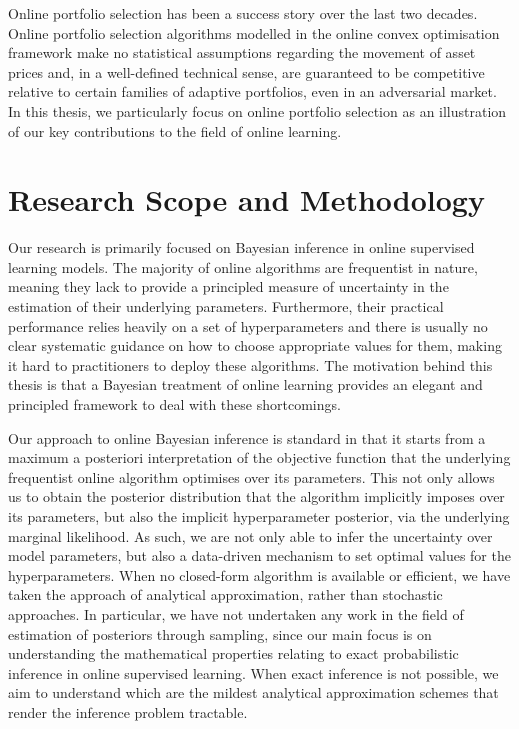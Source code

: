 Online portfolio selection has been a success story \citep{cover, eg, lugosi, ons, borodin04, cwmr, olps-survey} over the last two decades. Online portfolio selection algorithms modelled in the online convex optimisation framework make no statistical assumptions regarding the movement of asset prices \citep{cover, eg} and, in a well-defined technical sense, are guaranteed to be competitive relative to certain families of adaptive portfolios, even in an adversarial market. In this thesis, we particularly focus on online portfolio selection as an illustration of our key contributions to the field of online learning.




\section{Research Scope and Methodology}

Our research is primarily focused on Bayesian inference in online supervised learning models. The majority of online algorithms are frequentist in nature, meaning they lack to provide a principled measure of uncertainty in the estimation of their underlying parameters. Furthermore, their practical performance relies heavily on a set of hyperparameters and there is usually no clear systematic guidance on how to choose appropriate values for them, making it hard to practitioners to deploy these algorithms. The motivation behind this thesis is that a Bayesian treatment of online learning provides an elegant and principled framework to deal with these shortcomings.

Our approach to online Bayesian inference is standard in that it starts from a maximum a posteriori interpretation of the objective function that the underlying frequentist online algorithm optimises over its parameters. This not only allows us to obtain the posterior distribution that the algorithm implicitly imposes over its parameters, but also the implicit hyperparameter posterior, via the underlying marginal likelihood. As such, we are not only able to infer the uncertainty over model parameters, but also a data-driven mechanism to set optimal values for the hyperparameters. When no closed-form algorithm is available or efficient, we have taken the approach of analytical approximation, rather than stochastic approaches. In particular, we have not undertaken any work in the field of estimation of posteriors through sampling, since our main focus is on understanding the mathematical properties relating to exact probabilistic inference in online supervised learning. When exact inference is not possible, we aim to understand which are the mildest analytical approximation schemes that render the inference problem tractable.

